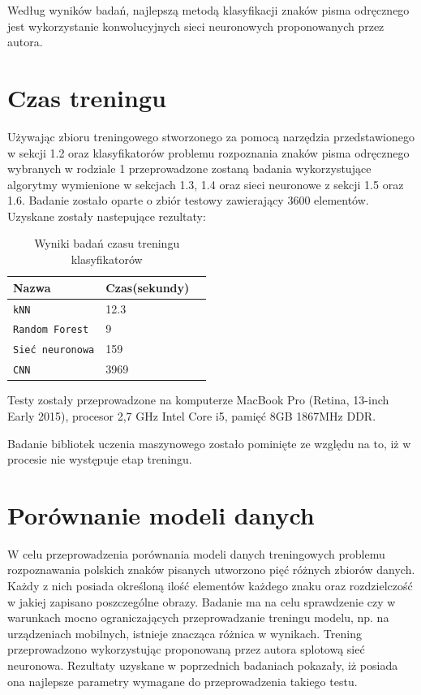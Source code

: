 \documentclass[brudnopis]{xmgr}
\begin{document}
Według wyników badań, najlepszą metodą klasyfikacji znaków pisma odręcznego jest wykorzystanie konwolucyjnych sieci neuronowych proponowanych przez autora.

\section{Czas treningu}

Używając zbioru treningowego stworzonego za pomocą narzędzia przedstawionego w sekcji 1.2 oraz klasyfikatorów problemu rozpoznania znaków pisma odręcznego wybranych w rodziale 1 przeprowadzone zostaną badania wykorzystujące algorytmy wymienione w sekcjach 1.3, 1.4 oraz sieci neuronowe z sekcji 1.5 oraz 1.6. Badanie zostało oparte o zbiór testowy zawierający 3600 elementów. Uzyskane zostały nastepujące rezultaty: 

\begin{table}[!htb]
\begin{tabular}{|l|l|l|} \hline
Nazwa & Czas(sekundy) \\ \hline
\texttt{kNN} & 12.3 \\ \hline
\texttt{Random Forest} & 9 \\ \hline
\texttt{Sieć neuronowa} & 159 \\ \hline
\texttt{CNN}     & 3969 \\ \hline
\end{tabular}
\caption{Wyniki badań czasu treningu klasyfikatorów}
\end{table}

Testy zostały przeprowadzone na komputerze MacBook Pro
(Retina, 13-inch Early 2015), procesor 2,7 GHz Intel Core i5, pamięć 8GB 1867MHz DDR.

Badanie bibliotek uczenia maszynowego zostało pominięte ze względu na to, iż w procesie nie występuje etap treningu.

\section{Porównanie modeli danych}

W celu przeprowadzenia porównania modeli danych treningowych problemu rozpoznawania polskich znaków pisanych utworzono pięć różnych zbiorów danych. Każdy z nich posiada określoną ilość elementów każdego znaku oraz rozdzielczość w jakiej zapisano poszczególne obrazy. Badanie ma na celu sprawdzenie czy w warunkach mocno ograniczających przeprowadzanie treningu modelu, np. na urządzeniach mobilnych, istnieje znacząca różnica w wynikach. Trening przeprowadzono wykorzystując proponowaną przez autora splotową sieć neuronowa. Rezultaty uzyskane w poprzednich badaniach pokazały, iż posiada ona najlepsze parametry wymagane do przeprowadzenia takiego testu.
\end{document}
